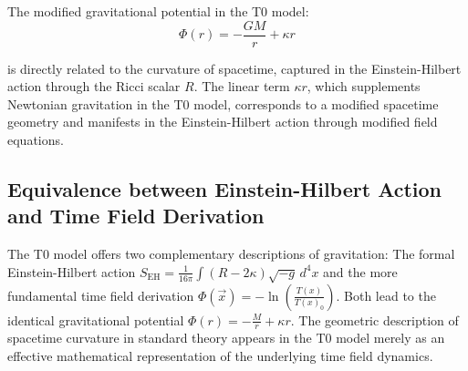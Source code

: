 \documentclass[12pt,a4paper]{article}
\newcommand{\Tfield}{T(x)}
\begin{document}
	The modified gravitational potential in the T0 model:
	\[
	\Phi(r) = -\frac{GM}{r} + \kappa r
	\]
	
	is directly related to the curvature of spacetime, captured in the Einstein-Hilbert action through the Ricci scalar $R$. The linear term $\kappa r$, which supplements Newtonian gravitation in the T0 model, corresponds to a modified spacetime geometry and manifests in the Einstein-Hilbert action through modified field equations.
\subsection*{Equivalence between Einstein-Hilbert Action and Time Field Derivation}

The T0 model offers two complementary descriptions of gravitation: The formal Einstein-Hilbert action $S_{\mathrm{EH}} = \frac{1}{16\pi} \int (R - 2\kappa) \sqrt{-g} \, d^4x$ and the more fundamental time field derivation $\Phi(\vec{x}) = -\ln\left(\frac{\Tfield}{\Tfield_0}\right)$. Both lead to the identical gravitational potential $\Phi(r) = -\frac{M}{r} + \kappa r$. The geometric description of spacetime curvature in standard theory appears in the T0 model merely as an effective mathematical representation of the underlying time field dynamics.
	
\end{document}
